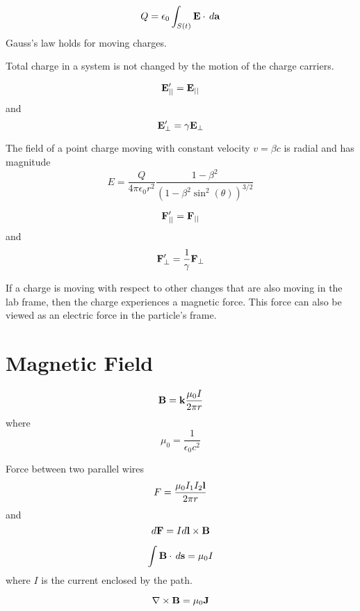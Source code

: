 \documentclass[a4paper]{article}
\begin{document}
\begin{thm} $$Q=\epsilon_0\int_{S(t)}\vb{E}\cdot\,d\vb{a}$$ Gauss's law holds for moving charges. 
\end{thm}

\begin{thm} Total charge in a system is not changed by the motion of the charge carriers. 
\end{thm}

\begin{thm} $$\vb{E}'_{||}=\vb{E}_{||}$$ and $$\vb{E}'_{\perp}=\gamma\vb{E}_{\perp}$$
\end{thm}

\begin{thm} The field of a point charge moving with constant velocity $v=\beta c$ is radial and has magnitude $$E=\frac{Q}{4\pi\epsilon_0r^2}\frac{1-\beta^2}{(1-\beta^2\sin^2(\theta))^{3/2}}$$
\end{thm}

\begin{thm} $$\vb{F}'_{||}=\vb{F}_{||}$$ and $$\vb{F}'_{\perp}=\frac{1}{\gamma}\vb{F}_{\perp}$$
\end{thm}

\begin{thm} If a charge is moving with respect to other changes that are also moving in the lab frame, then the charge experiences a magnetic force. This force can also be viewed as an electric force in the particle's frame. 
\end{thm}

\pagebreak
\section{Magnetic Field}
\begin{thm} $$\vb{B}=\vb{k}\frac{\mu_0I}{2\pi r}$$ where $$\mu_0=\frac{1}{\epsilon_0c^2}$$
\end{thm}

\begin{thm} Force between two parallel wires $$F=\frac{\mu_0I_1I_2\vb{l}}{2\pi r}$$ and $$d\vb{F}=Id\vb{l}\times\vb{B}$$
\end{thm}

\begin{thm} $$\int\vb{B}\cdot\,d\vb{s}=\mu_0I$$ where $I$ is the current enclosed by the path. 
\end{thm}

\begin{thm} $$\nabla\times\vb{B}=\mu_0\vb{J}$$
\end{thm}
\end{document}
